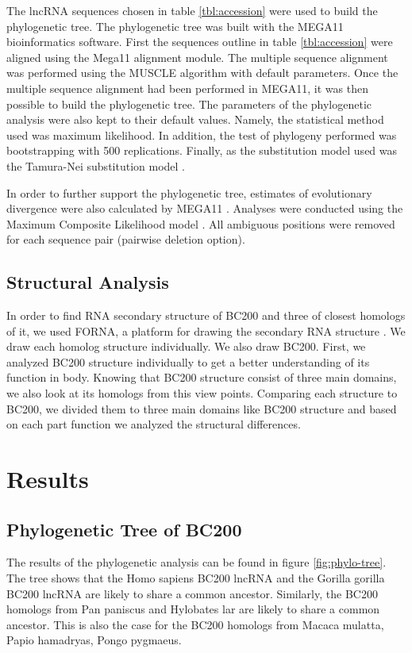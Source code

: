 \documentclass[conference]{IEEEtran}
\begin{document}
The lncRNA sequences chosen in table \ref{tbl:accession} were used to build the phylogenetic tree. 
The phylogenetic tree was built with the MEGA11 \cite{tamura2021mega11} bioinformatics software. 
First the sequences outline in table \ref{tbl:accession} were aligned using the Mega11 alignment module. 
The multiple sequence alignment was performed using the MUSCLE algorithm with default parameters. 
Once the multiple sequence alignment had been performed in MEGA11, it was then possible to build the phylogenetic tree. 
The parameters of the phylogenetic analysis were also kept to their default values. 
Namely, the statistical method used was maximum likelihood. 
In addition, the test of phylogeny performed was bootstrapping with 500 replications.
Finally, as the substitution model used was the Tamura-Nei substitution model \cite{tamura1993estimation}. 

In order to further support the phylogenetic tree, estimates of evolutionary divergence were also calculated by MEGA11 \cite{tamura2021mega11}. 
Analyses were conducted using the Maximum Composite Likelihood model \cite{tamura2004prospects}. 
All ambiguous positions were removed for each sequence pair (pairwise deletion option). 

\subsection{Structural Analysis}\label{sec:structure}

In order to find RNA secondary structure of BC200 and three of closest homologs of it, we used FORNA, a platform for drawing the secondary RNA structure \cite{kerpedjiev2015forna}. 
We draw each homolog structure individually. 
We also draw BC200. 
First, we analyzed BC200 structure individually to get a better understanding of its function in body. 
Knowing that BC200 structure consist of three main domains, we also look at its homologs from this view points. 
Comparing each structure to BC200, we divided them to three main domains like BC200 structure and based on each part function we analyzed the structural differences.

\section{Results}\label{sec:results}

\subsection{Phylogenetic Tree of BC200}
The results of the phylogenetic analysis can be found in figure \ref{fig:phylo-tree}. 
The tree shows that the Homo sapiens BC200 lncRNA and the Gorilla gorilla BC200 lncRNA are likely to share a common ancestor. 
Similarly, the BC200 homologs from Pan paniscus and Hylobates lar are likely to share a common ancestor. 
This is also the case for the BC200 homologs from Macaca mulatta, Papio hamadryas, Pongo pygmaeus. 
\end{document}
